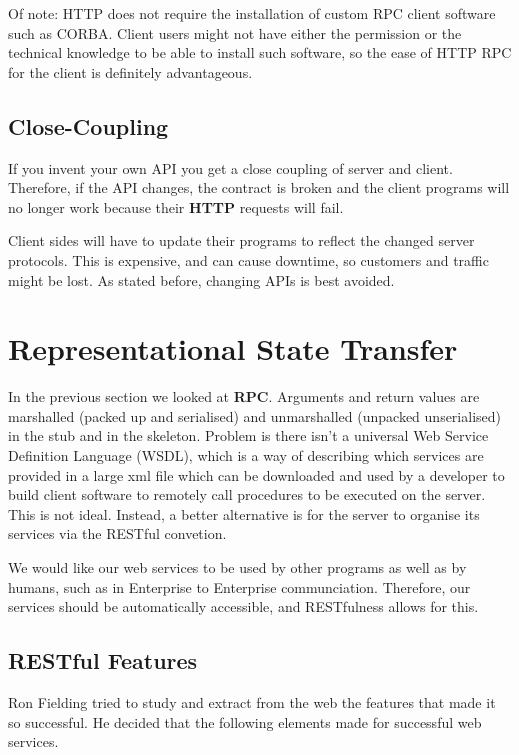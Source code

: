 \documentclass[11pt]{article}
\begin{document}
Of note: HTTP does not require the installation of custom RPC client software such as CORBA. Client users might not have either the permission or the technical knowledge to be able to install such software, so the ease of HTTP RPC for the client is definitely advantageous.

\subsection{Close-Coupling}

If you invent your own API you get a close coupling of server and client. Therefore, if the API changes, the contract is broken and the client programs will no longer work because their \textbf{HTTP} requests will fail.

Client sides will have to update their programs to reflect the changed server protocols. This is expensive, and can cause downtime, so customers and traffic might be lost. As stated before, changing APIs is best avoided.





\section{Representational State Transfer}
\label{sec:REST}

In the previous section we looked at \textbf{RPC}. Arguments and return values are marshalled (packed up and serialised) and unmarshalled (unpacked unserialised) in the stub and in the skeleton. Problem is there isn’t a universal Web Service Definition Language (WSDL), which is a way of describing which services are provided in a large xml file which can be downloaded and used by a developer to build client software to remotely call procedures to be executed on the server. This is not ideal. Instead, a better alternative is for the server to organise its services via the RESTful convetion.

We would like our web services to be used by other programs as well as by humans, such as in Enterprise to Enterprise communciation. Therefore, our services should be automatically accessible, and RESTfulness allows for this.

\subsection{RESTful Features}
Ron Fielding tried to study and extract from the web the features that made it so successful. He decided that the following elements made for successful web services.
\end{document}
